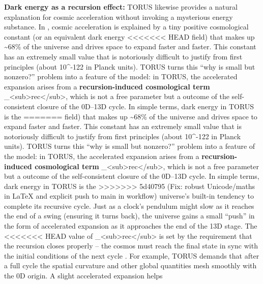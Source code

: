 \documentclass[]{article}
\begin{document}
\textbf{Dark energy as a recursion effect:} TORUS likewise provides a
natural explanation for cosmic acceleration without invoking a
mysterious energy substance. In \LambdaCDM, cosmic acceleration is explained
by a tiny positive cosmological constant \Lambda (or an equivalent dark energy
<<<<<<< HEAD
field) that makes up \textasciitilde68\% of the universe and drives
space to expand faster and faster. This constant \Lambda has an extremely
small value that is notoriously difficult to justify from first
principles (about 10\^{}-122 in Planck units)\hspace{0pt}. TORUS turns
this ``why is \Lambda small but nonzero?'' problem into a feature of the
model: in TORUS, the accelerated expansion arises from a
\textbf{recursion-induced cosmological term}
\Lambda\_\textless sub\textgreater rec\textless/sub\textgreater, which is not
a free parameter but a outcome of the self-consistent closure of the
0D--13D cycle\hspace{0pt}. In simple terms, dark energy in TORUS is the
=======
field) that makes up \textasciitilde{}68\% of the universe and drives
space to expand faster and faster. This constant \Lambda has an extremely
small value that is notoriously difficult to justify from first
principles (about 10\^{}-122 in Planck units)​. TORUS turns this ``why
is \Lambda small but nonzero?'' problem into a feature of the model: in TORUS,
the accelerated expansion arises from a \textbf{recursion-induced
cosmological term}
\Lambda\_\textless{}sub\textgreater{}rec\textless{}/sub\textgreater{}, which
is not a free parameter but a outcome of the self-consistent closure of
the 0D--13D cycle​. In simple terms, dark energy in TORUS is the
>>>>>>> 5d40795 (Fix: robust Unicode/maths in LaTeX and explicit push to main in workflow)
universe's built-in tendency to complete its recursive cycle. Just as a
clock's pendulum might slow as it reaches the end of a swing (ensuring
it turns back), the universe gains a small ``push'' in the form of
accelerated expansion as it approaches the end of the 13D stage. The
<<<<<<< HEAD
value of \Lambda\_\textless sub\textgreater rec\textless/sub\textgreater{} is
set by the requirement that the recursion closes properly -- the cosmos
must reach the final state in sync with the initial conditions of the
next cycle\hspace{0pt} \hspace{0pt}. For example, TORUS demands that
after a full cycle the spatial curvature and other global quantities
mesh smoothly with the 0D origin. A slight accelerated expansion helps
\end{document}
